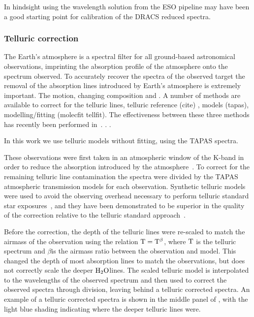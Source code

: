 




In hindsight using the wavelength solution from the ESO pipeline may have been a good starting point for calibration of the DRACS reduced spectra.


\subsubsection{Telluric correction}
\label{subsec:telluric_correction}
The Earth's atmosphere is a spectral filter for all ground-based astronomical observations, imprinting the absorption profile of the atmosphere onto the spectrum observed. To accurately recover the spectra of the observed target the removal of the absorption lines introduced by Earth's atmosphere is extremely important. The motion, changing composition and .
A number of methods are available to correct for the telluric lines, telluric reference (cite) , models (tapas), modelling/fitting (molecfit tellfit). The effectiveness between these three methods has recently been performed in~\cite{ulmer-moll_telluric_2018}.   . .

In this work we use telluric models without fitting, using the TAPAS spectra.

These observations were first taken in an atmospheric window of the K-band in order to reduce the absorption introduced by the atmosphere~\citep{barnes_hd_2008}.
 To correct for the remaining telluric line contamination the spectra were divided by the TAPAS\citep{bertaux_tapas_2014} atmospheric transmission models for each observation. Synthetic telluric models were used to avoid the observing overhead necessary to perform telluric standard star exposures~\citep{vacca_method_2003}, and they have been demonstrated to be superior in the quality of the correction relative to the telluric standard approach~\citep[e.g.][]{cotton_atmospheric_2014}.

Before the correction, the depth of the telluric lines were re-scaled to match the airmass of the observation using the relation \(\rm T = T^{\beta}\), where \(\rm T\) is the telluric spectrum and \(\beta\)is the airmass ratio between the observation and model. This changed the depth of most absorption lines to match the observations, but does not correctly scale the deeper \(\rm H_{2}O\)lines. The scaled telluric model is interpolated to the wavelengths of the observed spectrum and then used to correct the observed spectra through division, leaving behind a telluric corrected spectra. An example of a telluric corrected spectra is shown in the middle panel of , with the light blue shading indicating where the deeper telluric lines were.


